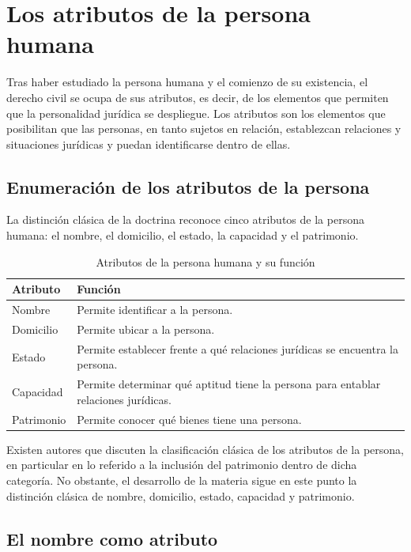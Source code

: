 \documentclass[12pt,oneside]{book}
\begin{document}
\chapter{Los atributos de la persona humana}

Tras haber estudiado la persona humana y el comienzo de su existencia, el derecho civil se ocupa de sus atributos, es decir, de los elementos que permiten que la personalidad jurídica se despliegue. Los atributos son los elementos que posibilitan que las personas, en tanto sujetos en relación, establezcan relaciones y situaciones jurídicas y puedan identificarse dentro de ellas.

\section{Enumeración de los atributos de la persona}

La distinción clásica de la doctrina reconoce cinco atributos de la persona humana: el nombre, el domicilio, el estado, la capacidad y el patrimonio.

\begin{table}[H]
\centering
\begin{tabularx}{\textwidth}{l X}
\toprule
\textbf{Atributo} & \textbf{Función} \\
\midrule
Nombre & Permite identificar a la persona. \\
Domicilio & Permite ubicar a la persona. \\
Estado & Permite establecer frente a qué relaciones jurídicas se encuentra la persona. \\
Capacidad & Permite determinar qué aptitud tiene la persona para entablar relaciones jurídicas. \\
Patrimonio & Permite conocer qué bienes tiene una persona. \\
\bottomrule
\end{tabularx}
\caption{Atributos de la persona humana y su función}
\end{table}

\begin{note}
Existen autores que discuten la clasificación clásica de los atributos de la persona, en particular en lo referido a la inclusión del patrimonio dentro de dicha categoría. No obstante, el desarrollo de la materia sigue en este punto la distinción clásica de nombre, domicilio, estado, capacidad y patrimonio.
\end{note}

\section{El nombre como atributo}
\end{document}
